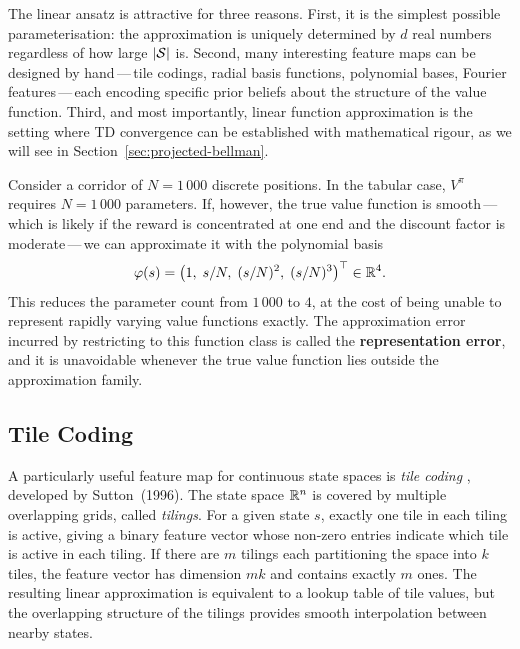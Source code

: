 The linear ansatz is attractive for three reasons.  First, it is the simplest possible
parameterisation: the approximation is uniquely determined by $d$ real numbers regardless of how
large $|\mathcal{S}|$ is.  Second, many interesting feature maps can be designed by hand\,---\,tile
codings, radial basis functions, polynomial bases, Fourier features\,---\,each encoding specific
prior beliefs about the structure of the value function.  Third, and most importantly, linear
function approximation is the setting where TD convergence can be established with mathematical
rigour, as we will see in Section~\ref{sec:projected-bellman}.

\begin{example}
\label{ex:poly-features}
Consider a corridor of $N = 1\,000$ discrete positions.  In the tabular case, $V^\pi$ requires
$N = 1\,000$ parameters.  If, however, the true value function is smooth\,---\,which is likely if
the reward is concentrated at one end and the discount factor is moderate\,---\,we can approximate
it with the polynomial basis
\[
\varphi(s) = \bigl(1,\; s/N,\; (s/N)^2,\; (s/N)^3\bigr)^\top \in \mathbb{R}^4.
\]
This reduces the parameter count from $1\,000$ to $4$, at the cost of being unable to represent
rapidly varying value functions exactly.  The approximation error incurred by restricting to this
function class is called the \textbf{representation error}, and it is
unavoidable whenever the true value function lies outside the approximation family.
\end{example}

\subsection{Tile Coding}

A particularly useful feature map for continuous state spaces is \emph{tile coding}%
, developed by Sutton~(1996).  The state space $\mathbb{R}^n$ is covered by multiple
overlapping grids, called \emph{tilings}.  For a given state $s$, exactly one tile in each tiling
is active, giving a binary feature vector whose non-zero entries indicate which tile is active in
each tiling.  If there are $m$ tilings each partitioning the space into $k$ tiles, the feature
vector has dimension $mk$ and contains exactly $m$ ones.  The resulting linear approximation is
equivalent to a lookup table of tile values, but the overlapping structure of the tilings provides
smooth interpolation between nearby states.

